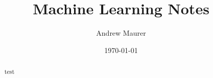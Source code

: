 \documentclass{amsart}
\begin{document}
\title{Machine Learning Notes}
\author{Andrew Maurer}
\date{\today}

\maketitle

\begin{abstract}
  test
\end{abstract}


\end{document}
